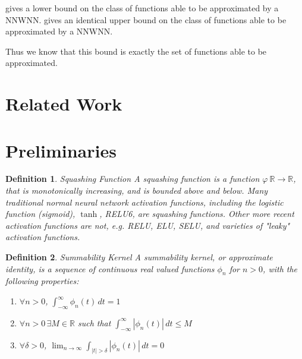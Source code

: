 \documentclass{article} %
\newtheorem{defn}{Definition}
\newcommand{\R}{\mathbb{R}}
\begin{document}
  gives a lower bound on the class of functions able to be approximated by a NNWNN.
 gives an identical upper bound on the class of functions able to be approximated by a NNWNN.

Thus we know that this bound is exactly the set of functions able to be approximated.
\section{Related Work}

\section{Preliminaries}

\begin{defn}{Squashing Function}
A squashing function is a function $\varphi\:\R \to \R$, that is monotonically increasing, and is bounded above and below.
Many traditional normal neural network activation functions, including the logistic function (sigmoid), $\tanh$, RELU6, are squashing functions.
Other more recent activation functions are not, e.g. RELU, ELU, SELU, and varieties of "leaky" activation functions.
\end{defn}

\begin{defn}{Summability Kernel}
A summability kernel, or approximate identity, is a sequence of continuous real valued functions $\phi_n$ for $n>0$, with the following properties:
\begin{enumerate}
	\item $\forall n>0$, $\int_{-\infty}^{\infty}\phi_{n}(t)\,dt=1$
	\item $\forall n>0\, \exists M \in \R$ such that $\int_{-\infty}^{\infty}|\phi_{n}(t)|\,dt\le M$
	\item $\forall \delta > 0$, ${\displaystyle \lim_{n\to\infty}}\int_{|t|>\delta}|\phi_{n}(t)|\,dt = 0$
\end{enumerate}
\end{defn}
\end{document}

